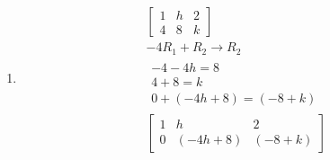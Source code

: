 \documentclass[12pt letter]{report}
\begin{document}
{\begin{enumerate}
\begin{enumerate}
\begin{align*}
\begin{bmatrix}
                      1 & h & 2 \\
                      4 & 8 & k
                    \end{bmatrix}                                    \\
                    -4R_1 + R_2 \to R_2                               \\
                    \begin{split}
                      -4 - 4h = 8 \\
                      4 + 8 = k   \\
                      0 + \left( -4h + 8 \right) = \left( -8 + k \right)
                    \end{split} \\
                    \begin{bmatrix}
                      1 & h                      & 2                    \\
                      0 & \left( -4h + 8 \right) & \left( -8 +k \right)
                    \end{bmatrix} \\
                    \\
                    h \neq 2
                  \end{align*}
                  $\therefore$ $h \neq 2$
            \item
                  \begin{align*}
                    \begin{bmatrix}
                      1 & h & 2 \\
                      4 & 8 & k
                    \end{bmatrix}                                    \\
                    -4R_1 + R_2 \to R_2                               \\
                    \begin{split}
                      -4 - 4h = 8 \\
                      4 + 8 = k   \\
                      0 + \left( -4h + 8 \right) = \left( -8 + k \right)
                    \end{split} \\
                    \begin{bmatrix}
                      1 & h                      & 2                    \\
                      0 & \left( -4h + 8 \right) & \left( -8 +k \right)

\end{bmatrix}
\end{align*}
\end{enumerate}
\end{enumerate}}
\end{document}

